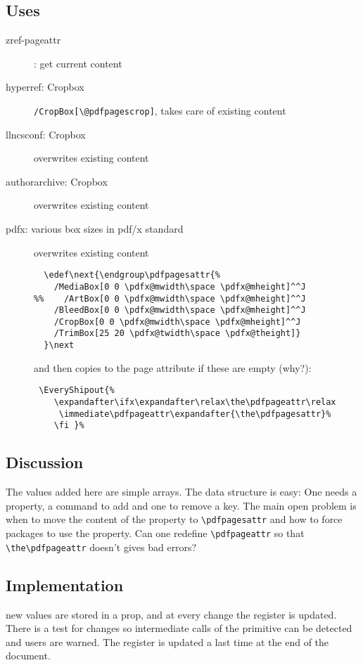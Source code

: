 \documentclass{article}
\begin{document}
\subsection{Uses}
\begin{description}
\item[zref-pageattr]: get current content
\item[hyperref: Cropbox] \verb+/CropBox[\@pdfpagescrop]+, takes care of existing content
\item[llncsconf: Cropbox]    overwrites existing content
\item[authorarchive: Cropbox] overwrites existing content
\item[pdfx: various box sizes in pdf/x standard]  overwrites existing content
\begin{verbatim}
  \edef\next{\endgroup\pdfpagesattr{%
    /MediaBox[0 0 \pdfx@mwidth\space \pdfx@mheight]^^J
%%    /ArtBox[0 0 \pdfx@mwidth\space \pdfx@mheight]^^J
    /BleedBox[0 0 \pdfx@mwidth\space \pdfx@mheight]^^J
    /CropBox[0 0 \pdfx@mwidth\space \pdfx@mheight]^^J
    /TrimBox[25 20 \pdfx@twidth\space \pdfx@theight]}
  }\next
\end{verbatim}
and then copies to the page attribute if these are empty (why?):
\begin{verbatim}
 \EveryShipout{%
    \expandafter\ifx\expandafter\relax\the\pdfpageattr\relax
     \immediate\pdfpageattr\expandafter{\the\pdfpagesattr}%
    \fi }%
\end{verbatim}
\end{description}

\subsection{Discussion}

The values added here are simple arrays. The data structure is easy: One needs a property, a command to add and one to remove a key. The main open problem is when to move the content of the property to \verb`\pdfpagesattr` and how to force packages to use the property. Can one redefine \verb+\pdfpageattr+ so that \verb+\the\pdfpageattr+ doesn't gives bad errors?

\subsection{Implementation}
new values are stored in a prop, and at every change the register is updated. There is a test for changes so intermediate calls of the primitive can be detected and users are warned. The register is updated a last time at the end of the document.
\end{document}
